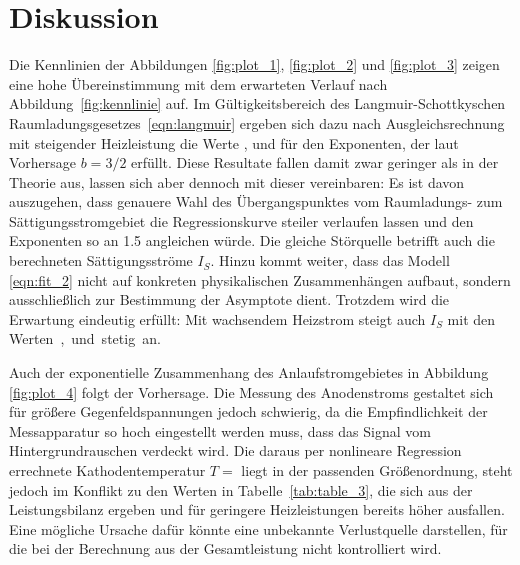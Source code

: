 \section{Diskussion}
\label{sec:diskussion}

Die Kennlinien der Abbildungen \ref{fig:plot_1}, \ref{fig:plot_2} und \ref{fig:plot_3} zeigen eine hohe Übereinstimmung mit dem
erwarteten Verlauf nach Abbildung~\ref{fig:kennlinie} auf. Im Gültigkeitsbereich des Langmuir-Schottkyschen
Raumladungsgesetzes~\eqref{eqn:langmuir} ergeben sich dazu nach Ausgleichsrechnung mit steigender Heizleistung die Werte
,  und  für den Exponenten, der laut Vorhersage $b = 3/2$ erfüllt. Diese
Resultate fallen damit zwar geringer als in der Theorie aus, lassen sich aber dennoch mit dieser vereinbaren: Es ist davon
auszugehen, dass genauere Wahl des Übergangspunktes vom Raumladungs- zum Sättigungsstromgebiet die Regressionskurve
steiler verlaufen lassen und den Exponenten so an \num{1.5} angleichen würde. Die gleiche Störquelle betrifft auch die
berechneten Sättigungsströme $I_S$. Hinzu kommt weiter, dass das Modell \ref{eqn:fit_2} nicht auf konkreten physikalischen
Zusammenhängen aufbaut, sondern ausschließlich zur Bestimmung der Asymptote dient. Trotzdem wird die Erwartung eindeutig erfüllt:
Mit wachsendem Heizstrom steigt auch $I_S$ mit den \mbox{Werten ,  und 
stetig an.}

Auch der exponentielle Zusammenhang des Anlaufstromgebietes in Abbildung \ref{fig:plot_4} folgt der Vorhersage. Die Messung des
Anodenstroms gestaltet sich für größere Gegenfeldspannungen jedoch schwierig, da die Empfindlichkeit der Messapparatur so hoch
eingestellt werden muss, dass das Signal vom Hintergrundrauschen verdeckt wird. Die daraus per nonlineare Regression errechnete
Kathodentemperatur $T = $ liegt in der passenden Größenordnung, steht jedoch im Konflikt zu den Werten in
Tabelle~\ref{tab:table_3}, die sich aus der Leistungsbilanz ergeben und für geringere Heizleistungen bereits höher ausfallen.
Eine mögliche Ursache dafür könnte eine unbekannte Verlustquelle darstellen, für die bei der Berechnung aus der Gesamtleistung
nicht kontrolliert wird.

